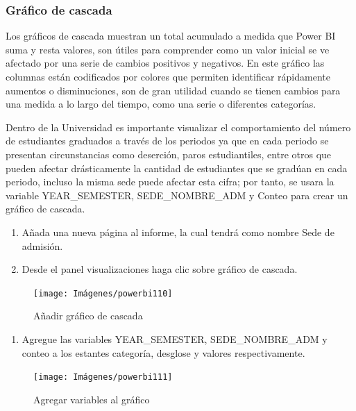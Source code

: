\documentclass[
]{book}
\providecommand{\tightlist}{%
  \setlength{\itemsep}{0pt}\setlength{\parskip}{0pt}}
\begin{document}
\hypertarget{graficocascada}{%
\subsubsection{Gráfico de cascada}\label{graficocascada}}

Los gráficos de cascada muestran un total acumulado a medida que Power BI suma y resta valores, son útiles para comprender como un valor inicial se ve afectado por una serie de cambios positivos y negativos. En este gráfico las columnas están codificados por colores que permiten identificar rápidamente aumentos o disminuciones, son de gran utilidad cuando se tienen cambios para una medida a lo largo del tiempo, como una serie o diferentes categorías.

Dentro de la Universidad es importante visualizar el comportamiento del número de estudiantes graduados a través de los periodos ya que en cada periodo se presentan circunstancias como deserción, paros estudiantiles, entre otros que pueden afectar drásticamente la cantidad de estudiantes que se gradúan en cada periodo, incluso la misma sede puede afectar esta cifra; por tanto, se usara la variable YEAR\_SEMESTER, SEDE\_NOMBRE\_ADM y Conteo para crear un gráfico de cascada.

\begin{enumerate}
\def\labelenumi{\arabic{enumi}.}
\item
  Añada una nueva página al informe, la cual tendrá como nombre Sede de admisión.
\item
  Desde el panel visualizaciones haga clic sobre gráfico de cascada.
\end{enumerate}

\begin{figure}

{\centering \texttt{[image: Imágenes/powerbi110]} 

}

\caption{Añadir gráfico de cascada}\label{fig:paso2cascada-fig}
\end{figure}

\begin{enumerate}
\def\labelenumi{\arabic{enumi}.}
\setcounter{enumi}{2}
\tightlist
\item
  Agregue las variables YEAR\_SEMESTER, SEDE\_NOMBRE\_ADM y conteo a los estantes categoría, desglose y valores respectivamente.
\end{enumerate}

\begin{figure}

{\centering \texttt{[image: Imágenes/powerbi111]} 

}

\caption{Agregar variables al gráfico}\label{fig:paso3cascada-fig}
\end{figure}
\end{document}
